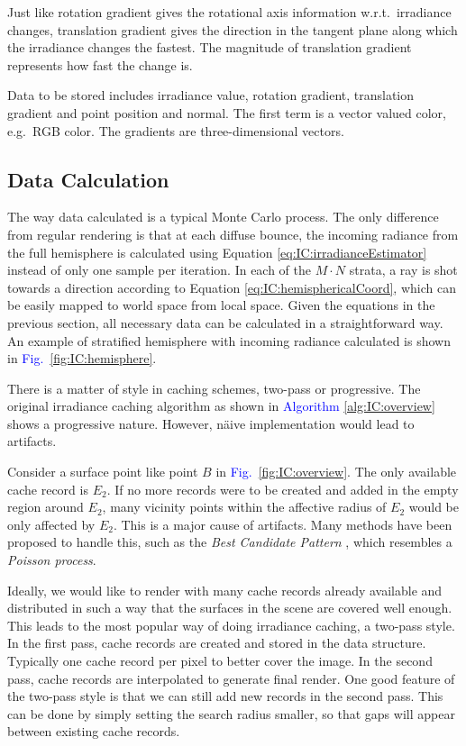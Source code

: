 \documentclass[]{book}
\renewcommand{\figurename}{\textcolor{blue}{Fig.\ }}
\begin{document}
Just like rotation gradient gives the rotational axis information w.r.t.\ irradiance changes, translation gradient gives the direction in the tangent plane along which the irradiance changes the fastest.
The magnitude of translation gradient represents how fast the change is.

Data to be stored includes irradiance value, rotation gradient, translation gradient and point position and normal.
The first term is a vector valued color, e.g.\ RGB color.
The gradients are three-dimensional vectors.

\subsection{Data Calculation}
\label{sec:IC:data:compute}
The way data calculated is a typical Monte Carlo process.
The only difference from regular rendering is that at each diffuse bounce, the incoming radiance from the full hemisphere is calculated using Equation \ref{eq:IC:irradianceEstimator} instead of only one sample per iteration.
In each of the $M\cdot N$ strata, a ray is shot towards a direction according to Equation \ref{eq:IC:hemisphericalCoord}, which can be easily mapped to world space from local space.
Given the equations in the previous section, all necessary data can be calculated in a straightforward way.
An example of stratified hemisphere with incoming radiance calculated is shown in \figurename \ref{fig:IC:hemisphere}.

There is a matter of style in caching schemes, two-pass or progressive.
The original irradiance caching algorithm as shown in \textcolor{blue}{Algorithm \ref{alg:IC:overview}} shows a progressive nature.
However, n{\"a}ive implementation would lead to artifacts.

Consider a surface point like point $B$ in \figurename \ref{fig:IC:overview}.
The only available cache record is $E_2$.
If no more records were to be created and added in the empty region around $E_2$, many vicinity points within the affective radius of $E_2$ would be only affected by $E_2$.
This is a major cause of artifacts.
Many methods have been proposed to handle this, such as the \textit{Best Candidate Pattern} \cite{PBRT3e}, which resembles a \textit{Poisson process}.

Ideally, we would like to render with many cache records already available and distributed in such a way that the surfaces in the scene are covered well enough.
This leads to the most popular way of doing irradiance caching, a two-pass style.
In the first pass, cache records are created and stored in the data structure.
Typically one cache record per pixel to better cover the image.
In the second pass, cache records are interpolated to generate final render.
One good feature of the two-pass style is that we can still add new records in the second pass.
This can be done by simply setting the search radius smaller, so that gaps will appear between existing cache records.
\end{document}
